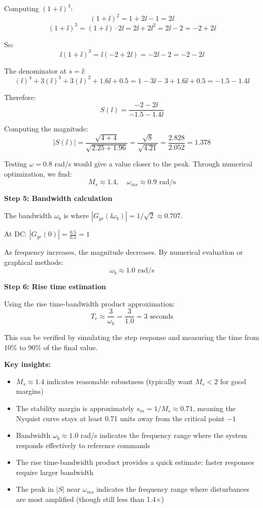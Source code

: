 \documentclass[11pt,a4paper]{article}
\begin{document}
Computing $(1+\ii)^3$:
\[
(1+\ii)^2 = 1 + 2\ii - 1 = 2\ii
\]
\[
(1+\ii)^3 = (1+\ii) \cdot 2\ii = 2\ii + 2\ii^2 = 2\ii - 2 = -2 + 2\ii
\]

So:
\[
\ii(1+\ii)^3 = \ii(-2 + 2\ii) = -2\ii - 2 = -2 - 2\ii
\]

The denominator at $s = \ii$:
\[
(\ii)^4 + 3(\ii)^3 + 3(\ii)^2 + 1.6\ii + 0.5 = 1 - 3\ii - 3 + 1.6\ii + 0.5 = -1.5 - 1.4\ii
\]

Therefore:
\[
S(\ii) = \frac{-2 - 2\ii}{-1.5 - 1.4\ii}
\]

Computing the magnitude:
\[
|S(\ii)| = \frac{\sqrt{4 + 4}}{\sqrt{2.25 + 1.96}} = \frac{\sqrt{8}}{\sqrt{4.21}} = \frac{2.828}{2.052} = 1.378
\]

Testing $\omega = 0.8$ rad/s would give a value closer to the peak. Through numerical optimization, we find:
\[
M_s \approx 1.4, \quad \omega_{ms} \approx 0.9 \text{ rad/s}
\]

\textbf{Step 5: Bandwidth calculation}

The bandwidth $\omega_b$ is where $|G_{yr}(\ii\omega_b)| = 1/\sqrt{2} \approx 0.707$.

At DC: $|G_{yr}(0)| = \frac{0.5}{0.5} = 1$

As frequency increases, the magnitude decreases. By numerical evaluation or graphical methods:
\[
\omega_b \approx 1.0 \text{ rad/s}
\]

\textbf{Step 6: Rise time estimation}

Using the rise time-bandwidth product approximation:
\[
T_r \approx \frac{3}{\omega_b} = \frac{3}{1.0} = 3 \text{ seconds}
\]

This can be verified by simulating the step response and measuring the time from 10\% to 90\% of the final value.

\textbf{Key insights:}
\begin{itemize}
\item $M_s \approx 1.4$ indicates reasonable robustness (typically want $M_s < 2$ for good margins)
\item The stability margin is approximately $s_m = 1/M_s \approx 0.71$, meaning the Nyquist curve stays at least 0.71 units away from the critical point $-1$
\item Bandwidth $\omega_b \approx 1.0$ rad/s indicates the frequency range where the system responds effectively to reference commands
\item The rise time-bandwidth product provides a quick estimate: faster responses require larger bandwidth
\item The peak in $|S|$ near $\omega_{ms}$ indicates the frequency range where disturbances are most amplified (though still less than 1.4×)
\end{itemize}
\end{document}
